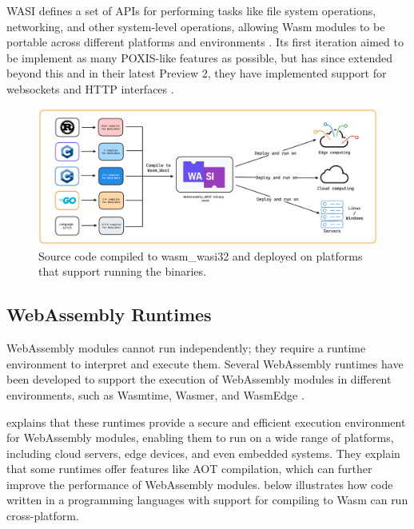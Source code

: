 \documentclass[
  table]{report}
\begin{document}
\ac{WASI} defines a set of APIs for performing tasks like file system
operations, networking, and other system-level operations, allowing
\ac{Wasm} modules to be portable across different platforms and
environments \citep{WASIDev}. Its first iteration aimed to be implement
as many POXIS-like features as possible, but has since extended beyond
this and in their latest Preview 2, they have implemented support for
websockets and HTTP interfaces \citep{WASIPreview2README}.

\begin{figure}[H]
\centering
  \includegraphics{assets/3-wasi-figure.png}
  \caption{Source code compiled to wasm\_wasi32 and deployed on platforms that support running the binaries.}
  \label{fig:wasm-wasi}
\end{figure}

\subsection{WebAssembly Runtimes}
\label{sect:wasm_runtimes}

WebAssembly modules cannot run independently; they require a runtime
environment to interpret and execute them. Several WebAssembly runtimes
have been developed to support the execution of WebAssembly modules in
different environments, such as Wasmtime, Wasmer, and WasmEdge
\citep{zhang2024}.

\citet{zhang2024} explains that these runtimes provide a secure and
efficient execution environment for WebAssembly modules, enabling them
to run on a wide range of platforms, including cloud servers, edge
devices, and even embedded systems. They explain that some runtimes
offer features like \ac{AOT} compilation, which can further improve the
performance of WebAssembly modules.  below
illustrates how code written in a programming languages with support for
compiling to \ac{Wasm} can run cross-platform.
\end{document}
